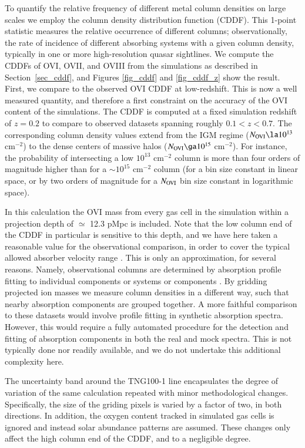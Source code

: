 \documentclass[useAMS,usenatbib]{mnras}
\newcommand{\ovi}{OVI\xspace}
\newcommand{\ovii}{OVII\xspace}
\newcommand{\oviii}{OVIII\xspace}
\begin{document}
To quantify the relative frequency of different metal column densities on large scales we employ the column density distribution function (CDDF). This 1-point statistic measures the relative occurrence of different columns; observationally, the rate of incidence of different absorbing systems with a given column density, typically in one or more high-resolution quasar sightlines. We compute the CDDFs of \ovi, \ovii, and \oviii from the simulations as described in Section~\ref{sec_cddf}, and Figures \ref{fig_cddf} and \ref{fig_cddf_z} show the result. First, we compare to the observed \ovi CDDF at low-redshift. This is now a well measured quantity, and therefore a first constraint on the accuracy of the \ovi content of the simulations. The CDDF is computed at a fixed simulation redshift of $z=0.2$ to compare to observed datasets spanning roughly $0.1 < z < 0.7$. The corresponding column density values extend from the IGM regime ($N_{\rm OVI} \la 10^{13}$ cm$^{-2}$) to the dense centers of massive halos ($N_{\rm OVI} \ga 10^{15}$ cm$^{-2}$). For instance, the probability of intersecting a low $10^{13}$ cm$^{-2}$ column is more than four orders of magnitude higher than for a $\sim 10^{15}$ cm$^{-2}$ column (for a bin size constant in linear space, or by two orders of magnitude for a $N_{\rm OVI}$ bin size constant in logarithmic space).

In this calculation the \ovi mass from every gas cell in the simulation within a projection depth of $\simeq$ 12.3 pMpc is included. Note that the low column end of the CDDF in particular is sensitive to this depth, and we have here taken a reasonable value for the observational comparison, in order to cover the typical allowed absorber velocity range \citep[see Methods \ref{sec_cddf} and][]{danforth16}. This is only an approximation, for several reasons. Namely, observational columns are determined by absorption profile fitting to individual components or systems or components \citep{tripp08}. By gridding projected ion masses we measure column densities in a different way, such that nearby absorption components are grouped together. A more faithful comparison to these datasets would involve profile fitting in synthetic absorption spectra. However, this would require a fully automated procedure for the detection and fitting of absorption components \citep[e.g.][]{dave97} in both the real and mock spectra. This is not typically done nor readily available, and we do not undertake this additional complexity here.

The uncertainty band around the TNG100-1 line encapsulates the degree of variation of the same calculation repeated with minor methodological changes. Specifically, the size of the griding pixels is varied by a factor of two, in both directions. In addition, the oxygen content tracked in simulated gas cells is ignored and instead solar abundance patterns are assumed. These changes only affect the high column end of the CDDF, and to a negligible degree.
\end{document}
